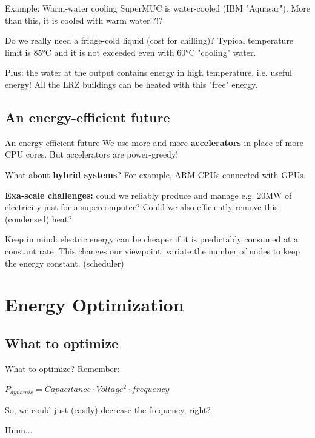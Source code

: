\documentclass[10pt, compress]{beamer}
\begin{document}
\begin{frame}[fragile]{Example: Warm-water cooling}
SuperMUC is water-cooled (IBM "Aquasar"). More than this, it is \alert{cooled with warm water}!?!? 

\pause

Do we really need a fridge-cold liquid (cost for chilling)? Typical temperature limit is 85°C
and it is not exceeded even with 60°C "cooling" water.

\pause

Plus: the water at the output contains energy in high temperature, i.e. useful energy!
\alert{All the LRZ buildings can be heated with this "free" energy.}
\end{frame}


\subsection{An energy-efficient future}

\begin{frame}[fragile]{An energy-efficient future}
 We use more and more \textbf{accelerators} in place of more CPU cores. But accelerators are power-greedy!
 
 \pause
 
 What about \textbf{hybrid systems}? For example, ARM CPUs connected with GPUs.
 
 \pause
 
 \textbf{Exa-scale challenges:} could we reliably produce and manage e.g. 20MW of electricity
 just for a supercomputer? Could we also efficiently remove this (condensed) heat?
 
 Keep in mind: electric energy can be cheaper if it is \alert{predictably consumed at a
 constant rate}. This changes our viewpoint: variate the number of nodes to keep the energy constant. (scheduler)
\end{frame}

\section{Energy Optimization}

\subsection{What to optimize}

\begin{frame}[fragile]{What to optimize?}
Remember:

\begin{math}
 P_{dynamic} = Capacitance \cdot Voltage^2 \cdot frequency
\end{math}

So, we could just (easily) decrease the frequency, right? 

Hmm...

\end{frame}
\end{document}
